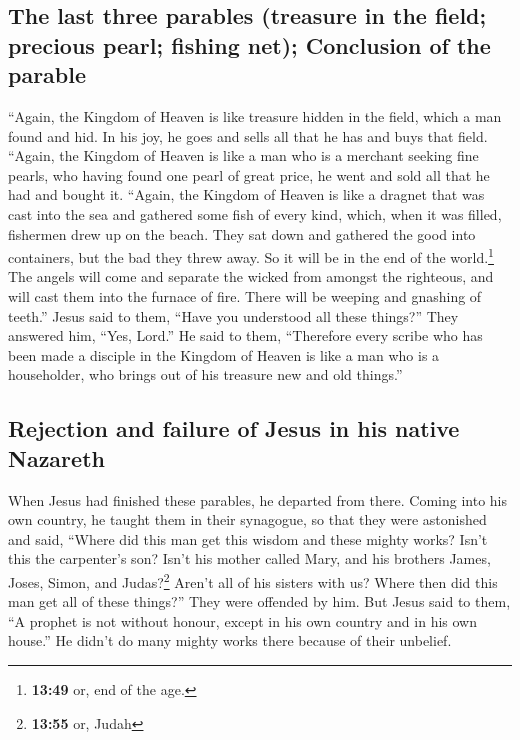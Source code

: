 \hypertarget{the-last-three-parables-treasure-in-the-field-precious-pearl-fishing-net-conclusion-of-the-parable}{%
\subsection{The last three parables (treasure in the field; precious
pearl; fishing net); Conclusion of the
parable}\label{the-last-three-parables-treasure-in-the-field-precious-pearl-fishing-net-conclusion-of-the-parable}}

 ``Again, the Kingdom of Heaven is like treasure hidden
in the field, which a man found and hid. In his joy, he goes and sells
all that he has and buys that field.  ``Again, the
Kingdom of Heaven is like a man who is a merchant seeking fine pearls,
 who having found one pearl of great price, he went and
sold all that he had and bought it.  ``Again, the Kingdom
of Heaven is like a dragnet that was cast into the sea and gathered some
fish of every kind,  which, when it was filled, fishermen
drew up on the beach. They sat down and gathered the good into
containers, but the bad they threw away.  So it will be
in the end of the world.\footnote{\textbf{13:49} or, end of the age.}
The angels will come and separate the wicked from amongst the righteous,
 and will cast them into the furnace of fire. There will
be weeping and gnashing of teeth.''  Jesus said to them,
``Have you understood all these things?'' They answered him, ``Yes,
Lord.''  He said to them, ``Therefore every scribe who
has been made a disciple in the Kingdom of Heaven is like a man who is a
householder, who brings out of his treasure new and old things.''

\hypertarget{rejection-and-failure-of-jesus-in-his-native-nazareth}{%
\subsection{Rejection and failure of Jesus in his native
Nazareth}\label{rejection-and-failure-of-jesus-in-his-native-nazareth}}

 When Jesus had finished these parables, he departed from
there.  Coming into his own country, he taught them in
their synagogue, so that they were astonished and said, ``Where did this
man get this wisdom and these mighty works?  Isn't this
the carpenter's son? Isn't his mother called Mary, and his brothers
James, Joses, Simon, and Judas?\footnote{\textbf{13:55} or, Judah}
 Aren't all of his sisters with us? Where then did this
man get all of these things?''  They were offended by
him. But Jesus said to them, ``A prophet is not without honour, except
in his own country and in his own house.''  He didn't do
many mighty works there because of their unbelief.

